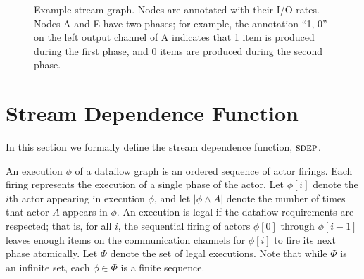 
\begin{figure}[t]
\begin{center}
\caption{{\small Example stream graph. Nodes are annotated with their
I/O rates. Nodes A and E have two phases; for example, the annotation
``1, 0'' on the left output channel of A indicates that 1 item is
produced during the first phase, and 0 items are produced during the second phase.
\protect\label{fig:sdep-rates}}}
\end{center}
\vspace{-12pt}
\end{figure}

\section{Stream Dependence Function}
\label{sec:sdep}

In this section we formally define the stream dependence function,
$\textsc{sdep}$.

An execution $\phi$ of a dataflow graph is an ordered sequence of
actor firings.  Each firing represents the execution of a single phase
of the actor.  Let $\phi[i]$ denote the $i$th actor appearing in
execution $\phi$, and let $|\phi \wedge A|$ denote the number of times
that actor $A$ appears in $\phi$.  An execution is legal if the
dataflow requirements are respected; that is, for all $i$, the
sequential firing of actors $\phi[0]$ through $\phi[i-1]$ leaves
enough items on the communication channels for $\phi[i]$ to fire its
next phase atomically.  Let $\Phi$ denote the set of legal executions.
Note that while $\Phi$ is an infinite set, each $\phi \in \Phi$ is a
finite sequence.

